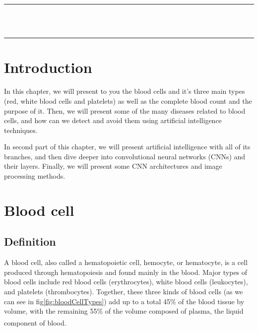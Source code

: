 \thispagestyle{empty}
\vspace*{\fill}
\begin{center}
    {\color{Black} \rule{\linewidth}{1.2mm} }\\
\vspace{0.25in}
{\centering{}}
\vspace{0.35in}\\
    {\color{Black} \rule{\linewidth}{1.2mm} }
\end{center}
\vspace*{\fill}
\setcounter{section}{0}

\newpage

\section{Introduction}
\vspace{0.2in}
\hspace{\parindent}
In this chapter, we will present to you the blood cells and it's three main types (red, white blood cells and platelets) as well as the complete blood count and the purpose of it. Then, we will present some of the many diseases related to blood cells, and how can we detect and avoid them using artificial intelligence techniques.

In second part of this chapter, we will present artificial intelligence with all of its branches, and then dive deeper into convolutional neural networks (CNNs) and their layers. Finally, we will present some CNN architectures and image processing methods.
\section{Blood cell}
\subsection{Definition}
\hspace{\parindent}
A blood cell, also called a hematopoietic cell, hemocyte, or hematocyte, is a cell produced through hematopoiesis and found mainly in the blood. Major types of blood cells include red blood cells (erythrocytes), white blood cells (leukocytes), and platelets (thrombocytes). Together, these three kinds of blood cells (as we can see in fig\ref{fig:bloodCellTypes}) add up to a total 45\% of the blood tissue by volume, with the remaining 55\% of the volume composed of plasma, the liquid component of blood. \textsuperscript{\cite{hopkins1993human}}\\

